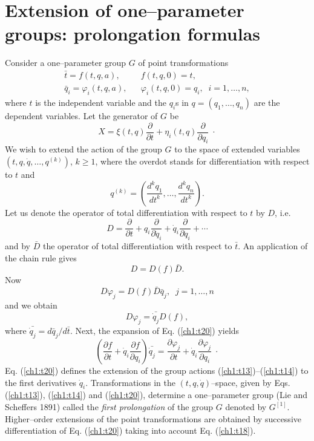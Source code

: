 \section{Extension of one--parameter groups: prolongation formulas}
Consider a one--parameter group $G$ of point transformations
\begin{eqnarray}
\bar t = f(t,q,a),  & & f(t,q,0)=t, \label{ch1:t13}\\
\bar q_i =\varphi_i (t,q,a), & & \varphi_i (t,q,0)=q_i,\;\; i=1,\ldots,n,
\label{ch1:t14}
\end{eqnarray}
where $t$ is the independent variable and the $q_i$s in
$q=(q_1,\dots, q_n)$ are the dependent
variables. Let the generator of $G$ be
\begin{equation}
\label{ch1:t15}
X=\xi (t,q)\frac{\partial}{\partial t}+
\eta_i (t,q)\frac{\partial}{\partial q_i}\; \cdot
\end{equation}
We wish to extend the action of the group $G$ to the space of
extended variables 
$(t,q, \dot q,\ldots, q^{(k)})$, $k\ge 1$, where the
overdot stands for differentiation with respect to $t$ and
\begin{equation}
\label{ch1:t16}
q^{(k)}=\left (\frac{d^k q_1}{dt^k},\ldots,\frac{d^k q_n}{dt^k}\right).
\end{equation}
Let us denote the operator of total differentiation with respect to $t$ by
$D$, i.e.
\begin{equation}
\label{ch1:t17}
D = \frac{\partial}{\partial t}+q_i\frac{\partial}{\partial \dot q_i}
      + \dot q_i\frac{\partial}{\partial \ddot q_i}+\cdots
\end{equation}
and by $\bar D$ the operator of total differentiation with respect
to $\bar t$. An application of the chain rule gives
\begin{equation}
\label{ch1:t18}
D=D(f)\bar D.
\end{equation}
Now
\begin{equation}
\label{ch1:t19}
D \varphi_j =D(f)\bar D\bar q_j, \;\; j=1,\ldots ,n
\end{equation}
and  we obtain
\begin{equation}
\label{ch1:t20}
D\varphi_j  = \bar{\dot q_j} D(f),
\end{equation}
where $\bar{\dot q_j}= d\bar q_j/d\bar t$. Next, the expansion of
Eq. (\ref{ch1:t20}) yields
\begin{equation}
\label{ch1:t21}
\left (\frac{\partial f}{\partial t}+\dot q_i \frac{\partial f}{\partial q_i}
\right )\bar{\dot q_j}= \frac{\partial \varphi_j}{\partial t} +
\dot q_i \frac{\partial \varphi_j}{\partial q_i}\; \cdot
\end{equation}
Eq. (\ref{ch1:t20}) defines the extension of the group actions
(\ref{ch1:t13})--(\ref{ch1:t14}) to the first derivatives $\dot q_i$.
Transformations in the $(t,q,\dot q)$--space,
given by Eqs. (\ref{ch1:t13}), (\ref{ch1:t14}) and
(\ref{ch1:t20}),
determine a one--parameter group (Lie and Scheffers 1891) called
the {\em first prolongation} of the group $G$ denoted by $G^{[1]}$.
Higher--order  extensions of the point transformations are obtained by
successive differentiation of Eq. (\ref{ch1:t20}) taking into account
Eq. (\ref{ch1:t18}).

